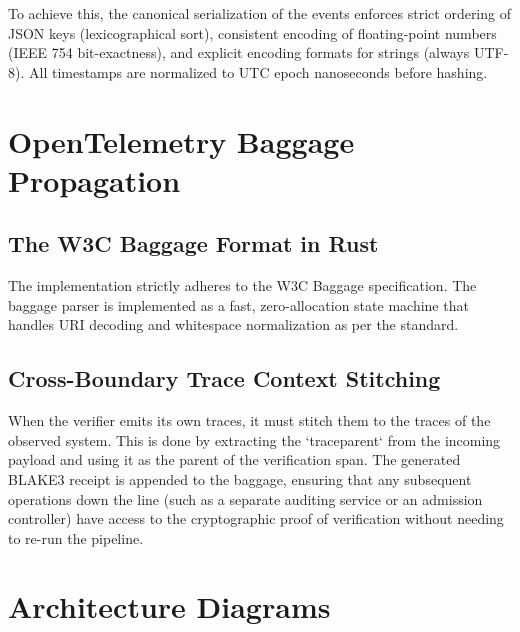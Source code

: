 To achieve this, the canonical serialization of the events enforces strict ordering of JSON keys (lexicographical sort), consistent encoding of floating-point numbers (IEEE 754 bit-exactness), and explicit encoding formats for strings (always UTF-8). All timestamps are normalized to UTC epoch nanoseconds before hashing.

\section{OpenTelemetry Baggage Propagation}
\subsection{The W3C Baggage Format in Rust}
The implementation strictly adheres to the W3C Baggage specification. The baggage parser is implemented as a fast, zero-allocation state machine that handles URI decoding and whitespace normalization as per the standard.

\subsection{Cross-Boundary Trace Context Stitching}
When the verifier emits its own traces, it must stitch them to the traces of the observed system. This is done by extracting the `traceparent` from the incoming payload and using it as the parent of the verification span. The generated BLAKE3 receipt is appended to the baggage, ensuring that any subsequent operations down the line (such as a separate auditing service or an admission controller) have access to the cryptographic proof of verification without needing to re-run the pipeline.

\section{Architecture Diagrams}

